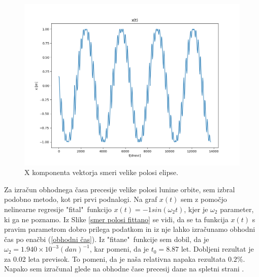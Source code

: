 \documentclass[titlepage,12pt,a4paper]{article}
\begin{document}
\begin{figure}[H]
\begin{center}
	\includegraphics[scale=0.6]{Slike/smer_glavne_polosi}
	\caption{X komponenta vektorja smeri velike polosi elipse.}
	\label{smer polosi}
\end{center}
\end{figure}

Za izračun obhodnega časa precesije velike polosi lunine orbite, sem izbral podobno metodo, kot pri prvi podnalogi. Na graf $x(t)$ sem z pomočjo nelinearne regresije "fital"\ funkcijo $x(t) = -1 sin(\omega_2 t)$, kjer je $\omega_2$ parameter, ki ga ne poznamo. Iz Slike \ref{smer polosi fittano} se vidi, da se ta funkcija $x(t)$ s pravim parametrom dobro prilega podatkom in iz nje lahko izračunamo obhodni čas po enačbi (\ref{obhodni čas}). Iz "fitane"\ funkcije sem dobil, da je $\omega_2 = 1.940\times 10^{-3}(dan)^{-1}$, kar pomeni, da je $t_0 = 8.87$ let. Dobljeni rezultat je za 0.02 leta previsok. To pomeni, da je naša relativna napaka rezultata $0.2\%$. Napako sem izračunal glede na obhodne čase precesij dane na spletni strani \cite{Lun. preces.}.
\end{document}
